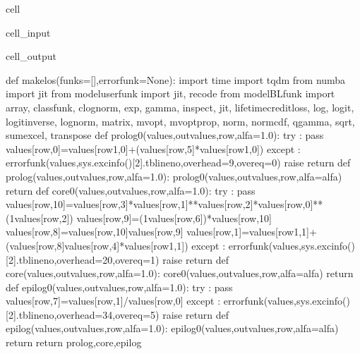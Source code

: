 \documentclass[letterpaper,10pt,english]{jupyterBook}
\begin{document}
\begin{sphinxuseclass}{cell}\begin{sphinxVerbatimInput}

\begin{sphinxuseclass}{cell_input}
\begin{sphinxVerbatim}[commandchars=\\\{\}]
\end{sphinxVerbatim}

\end{sphinxuseclass}\end{sphinxVerbatimInput}
\begin{sphinxVerbatimOutput}

\begin{sphinxuseclass}{cell_output}
\begin{sphinxVerbatim}[commandchars=\\\{\}]
def make\PYGZus{}los(funks=[],errorfunk=None):
    import time
    import tqdm
    from numba import jit
    from modeluserfunk import jit, recode
    from modelBLfunk import array, classfunk, clognorm, exp, gamma, inspect, jit, lifetime\PYGZus{}credit\PYGZus{}loss, log, logit, logit\PYGZus{}inverse, lognorm, matrix, mv\PYGZus{}opt, mv\PYGZus{}opt\PYGZus{}prop, norm, normcdf, qgamma, sqrt, sum\PYGZus{}excel, transpose
    def prolog0(values,outvalues,row,alfa=1.0):
        try :
            pass
            values[row,0]=values[row\PYGZhy{}1,0]+(values[row,5]*values[row\PYGZhy{}1,0])
        except :
            errorfunk(values,sys.exc\PYGZus{}info()[2].tb\PYGZus{}lineno,overhead=9,overeq=0)
            raise
        return 
    def prolog(values,outvalues,row,alfa=1.0):
        prolog0(values,outvalues,row,alfa=alfa)
        return  
    def core0(values,outvalues,row,alfa=1.0):
        try :
            pass
            values[row,10]=values[row,3]*values[row,1]**values[row,2]*values[row,0]**(1\PYGZhy{}values[row,2])
            values[row,9]=(1\PYGZhy{}values[row,6])*values[row,10]
            values[row,8]=values[row,10]\PYGZhy{}values[row,9]
            values[row,1]=values[row\PYGZhy{}1,1]+(values[row,8]\PYGZhy{}values[row,4]*values[row\PYGZhy{}1,1])
        except :
            errorfunk(values,sys.exc\PYGZus{}info()[2].tb\PYGZus{}lineno,overhead=20,overeq=1)
            raise
        return 
    def core(values,outvalues,row,alfa=1.0):
        core0(values,outvalues,row,alfa=alfa)
        return  
    def epilog0(values,outvalues,row,alfa=1.0):
        try :
            pass
            values[row,7]=values[row,1]/values[row,0]
        except :
            errorfunk(values,sys.exc\PYGZus{}info()[2].tb\PYGZus{}lineno,overhead=34,overeq=5)
            raise
        return 
    def epilog(values,outvalues,row,alfa=1.0):
        epilog0(values,outvalues,row,alfa=alfa)
        return  
    return prolog,core,epilog
\end{sphinxVerbatim}

\end{sphinxuseclass}\end{sphinxVerbatimOutput}

\end{sphinxuseclass}
\sphinxstepscope
\end{document}
